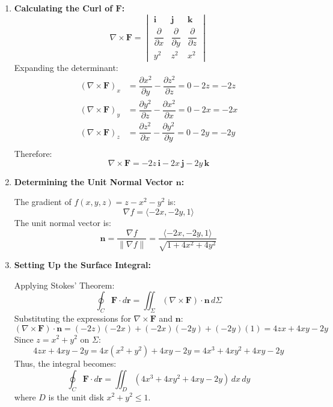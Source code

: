 \begin{example}
\begin{solution}
\begin{enumerate}
    \item \textbf{Calculating the Curl of $\mathbf{F}$:}
    \[
    \nabla \times \mathbf{F} = \begin{vmatrix}
    \mathbf{i} & \mathbf{j} & \mathbf{k} \\
    \dfrac{\partial}{\partial x} & \dfrac{\partial}{\partial y} & \dfrac{\partial}{\partial z} \\
    y^2 & z^2 & x^2
    \end{vmatrix}
    \]
    Expanding the determinant:
    \[
    \begin{aligned}
    (\nabla \times \mathbf{F})_x &= \dfrac{\partial x^2}{\partial y} - \dfrac{\partial z^2}{\partial z} = 0 - 2z = -2z \\
    (\nabla \times \mathbf{F})_y &= \dfrac{\partial y^2}{\partial z} - \dfrac{\partial x^2}{\partial x} = 0 - 2x = -2x \\
    (\nabla \times \mathbf{F})_z &= \dfrac{\partial z^2}{\partial x} - \dfrac{\partial y^2}{\partial y} = 0 - 2y = -2y \\
    \end{aligned}
    \]
    Therefore:
    \[
    \nabla \times \mathbf{F} = -2z\,\mathbf{i} - 2x\,\mathbf{j} - 2y\,\mathbf{k}
    \]
    
    \item \textbf{Determining the Unit Normal Vector $\mathbf{n}$:}
    
    The gradient of $f(x,y,z) = z - x^2 - y^2$ is:
    \[
    \nabla f = \langle -2x, -2y, 1 \rangle
    \]
    The unit normal vector is:
    \[
    \mathbf{n} = \dfrac{\nabla f}{\|\nabla f\|} = \dfrac{\langle -2x, -2y, 1 \rangle}{\sqrt{1 + 4x^2 + 4y^2}}
    \]
    
    \item \textbf{Setting Up the Surface Integral:}
    
    Applying Stokes' Theorem:
    \[
    \oint_C \mathbf{F} \cdot d\mathbf{r} = \iint_\Sigma (\nabla \times \mathbf{F}) \cdot \mathbf{n}\,d\Sigma
    \]
    Substituting the expressions for $\nabla \times \mathbf{F}$ and $\mathbf{n}$:
    \[
    (\nabla \times \mathbf{F}) \cdot \mathbf{n} = (-2z)(-2x) + (-2x)(-2y) + (-2y)(1) = 4zx + 4xy - 2y
    \]
    Since $z = x^2 + y^2$ on $\Sigma$:
    \[
    4zx + 4xy - 2y = 4x(x^2 + y^2) + 4xy - 2y = 4x^3 + 4xy^2 + 4xy - 2y
    \]
    Thus, the integral becomes:
    \[
    \oint_C \mathbf{F} \cdot d\mathbf{r} = \iint_D (4x^3 + 4xy^2 + 4xy - 2y)\,dx\,dy
    \]
    where $D$ is the unit disk $x^2 + y^2 \leq 1$.
    

\end{enumerate}
\end{solution}
\end{example}
